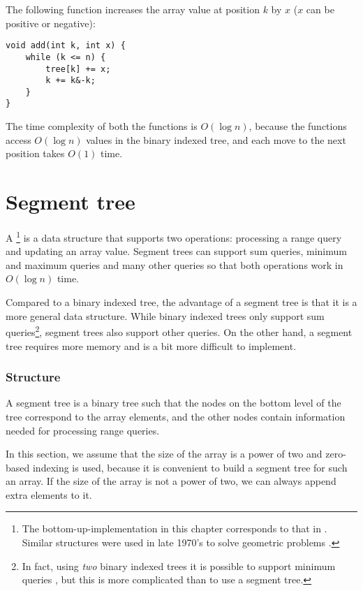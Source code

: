 The following function increases the
array value at position $k$ by $x$
($x$ can be positive or negative):
\begin{lstlisting}
void add(int k, int x) {
    while (k <= n) {
        tree[k] += x;
        k += k&-k;
    }
}
\end{lstlisting}

The time complexity of both the functions is
$O(\log n)$, because the functions access $O(\log n)$
values in the binary indexed tree, and each move
to the next position takes $O(1)$ time.

\section{Segment tree}


A \footnote{The bottom-up-implementation in this chapter corresponds to
that in \cite{sta06}. Similar structures were used
in late 1970's to solve geometric problems \cite{ben80}.} is a data structure
that supports two operations:
processing a range query and
updating an array value.
Segment trees can support
sum queries, minimum and maximum queries and many other
queries so that both operations work in $O(\log n)$ time.

Compared to a binary indexed tree,
the advantage of a segment tree is that it is
a more general data structure.
While binary indexed trees only support
sum queries\footnote{In fact, using \emph{two} binary
indexed trees it is possible to support minimum queries \cite{dim15},
but this is more complicated than to use a segment tree.},
segment trees also support other queries.
On the other hand, a segment tree requires more
memory and is a bit more difficult to implement.

\subsubsection{Structure}

A segment tree is a binary tree
such that the nodes on the bottom level of the tree
correspond to the array elements,
and the other nodes
contain information needed for processing range queries.

In this section, we assume that the size
of the array is a power of two and zero-based
indexing is used, because it is convenient to build
a segment tree for such an array.
If the size of the array is not a power of two,
we can always append extra elements to it.

